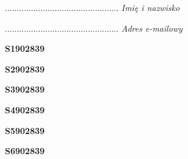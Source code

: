 \begin{turn}{90}\begin{minipage}{\linewidth} \vspace{20mm} ................................................  \textit{Imię i nazwisko}\end{minipage}\end{turn}

\begin{turn}{90}\begin{minipage}{\linewidth} \vspace{20mm} ................................................  \textit{Adres e-mailowy}\end{minipage}\end{turn}

\begin{turn}{90}\huge \begin{minipage}{\linewidth} \vspace{10mm}\textbf{S1902839}\end{minipage}\end{turn}

\begin{turn}{90}\huge \begin{minipage}{\linewidth} \vspace{10mm}\textbf{S2902839}\end{minipage}\end{turn}

\begin{turn}{90}\huge \begin{minipage}{\linewidth} \vspace{10mm}\textbf{S3902839}\end{minipage}\end{turn}

\begin{turn}{90}\huge \begin{minipage}{\linewidth} \vspace{10mm}\textbf{S4902839}\end{minipage}\end{turn}

\begin{turn}{90}\huge \begin{minipage}{\linewidth} \vspace{10mm}\textbf{S5902839}\end{minipage}\end{turn}

\begin{turn}{90}\huge \begin{minipage}{\linewidth} \vspace{10mm}\textbf{S6902839}\end{minipage}\end{turn}

